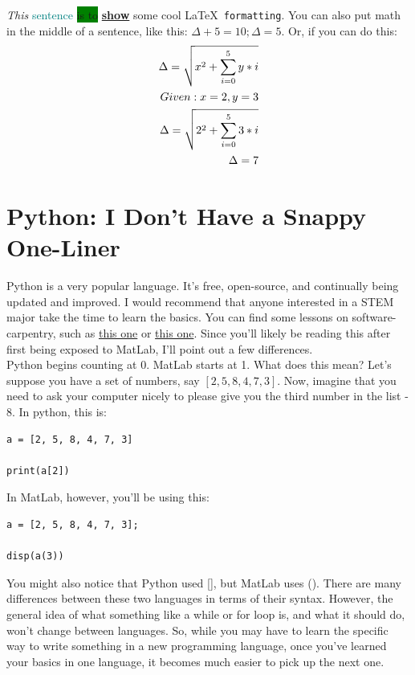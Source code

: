 \documentclass[letterpaper]{article}
\begin{document}
\emph{This} \textcolor{teal}{sentence} \colorbox{green}{is to} \underline{\textbf{show}} {\LARGE{some}} {\tiny{cool}} \LaTeX \texttt{ formatting}.  You can also put math in the middle of a sentence, like this: $ \Delta + 5 = 10 ; \Delta = 5$.  Or, if you can do this:
\begin{align}
\Delta = \sqrt{x^{2} + \sum_{i = 0}^{5}y*i} \label{eq:eq1} \\
Given: x = 2, y = 3 \nonumber \\
\Delta = \sqrt{2^{2} + \sum_{i = 0}^{5}3*i} \label{eq:eq1.1} \\
\Delta = 7 \notag
\end{align}

\section{Python: I Don't Have a Snappy One-Liner}

Python is a very popular language.  It's free, open-source, and continually being updated and improved.  I would recommend that anyone interested in a STEM major take the time to learn the basics.  You can find some lessons on software-carpentry, such as \href{http://swcarpentry.github.io/python-novice-inflammation/}{this one} or \href{http://swcarpentry.github.io/python-novice-gapminder/}{this one}.  Since you'll likely be reading this after first being exposed to MatLab, I'll point out a few differences.\\

Python begins counting at 0.  MatLab starts at 1.  What does this mean?  Let's suppose you have a set of numbers, say $[2, 5, 8, 4, 7, 3]$.  Now, imagine that you need to ask your computer nicely to please give you the third number in the list - 8.  In python, this is:
\begin{verbatim}
a = [2, 5, 8, 4, 7, 3]

print(a[2])
\end{verbatim}
In MatLab, however, you'll be using this:
\begin{verbatim}
a = [2, 5, 8, 4, 7, 3];

disp(a(3))
\end{verbatim}
You might also notice that Python used [], but MatLab uses ().  There are many differences between these two languages in terms of their syntax.  However, the general idea of what something like a while or for loop is, and what it should do, won't change between languages.  So, while you may have to learn the specific way to write something in a new programming language, once you've learned your basics in one language, it becomes much easier to pick up the next one.
\end{document}
